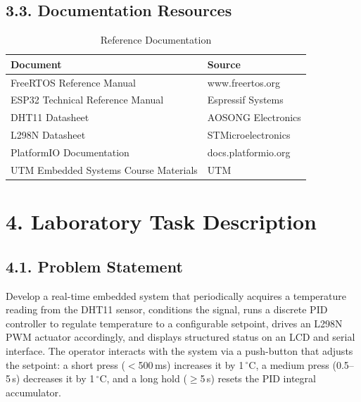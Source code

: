 \documentclass[12pt]{article}
\begin{document}
\subsection*{3.3. Documentation Resources}

\begin{table}[H]
    \centering
    \caption{Reference Documentation}
    \begin{tabular}{|l|l|}
        \hline
        \textbf{Document} & \textbf{Source} \\
        \hline
        FreeRTOS Reference Manual & www.freertos.org \\
        \hline
        ESP32 Technical Reference Manual & Espressif Systems \\
        \hline
        DHT11 Datasheet & AOSONG Electronics \\
        \hline
        L298N Datasheet & STMicroelectronics \\
        \hline
        PlatformIO Documentation & docs.platformio.org \\
        \hline
        UTM Embedded Systems Course Materials & UTM \\
        \hline
    \end{tabular}
\end{table}

\section*{4. Laboratory Task Description}

\subsection*{4.1. Problem Statement}

Develop a real-time embedded system that periodically acquires a temperature reading from the DHT11
sensor, conditions the signal, runs a discrete PID controller to regulate temperature to a
configurable setpoint, drives an L298N PWM actuator accordingly, and displays structured status on an
LCD and serial interface. The operator interacts with the system via a push-button that adjusts the
setpoint: a short press ($<$500\,ms) increases it by 1\,$^\circ$C, a medium press (0.5--5\,s) decreases
it by 1\,$^\circ$C, and a long hold ($\geq$5\,s) resets the PID integral accumulator.
\end{document}
